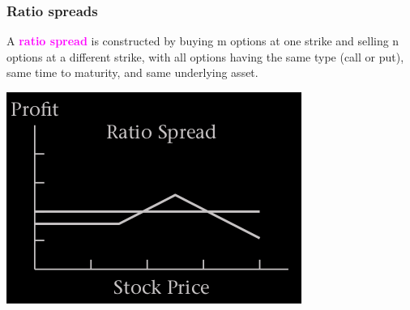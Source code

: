 \begin{frame}[fragile,t]
	\frametitle{Ratio spreads}

	A \textcolor{magenta}{\bf ratio spread} is constructed by buying m options at one strike and
	selling n options at a different strike, with all options having the same type (call or put), same
	time to maturity, and same underlying asset.
	\bigskip

	\begin{center}
		\includegraphics[scale=0.3]{figs/Profit_Ratio_Spread.png}
	\end{center}

\end{frame}
